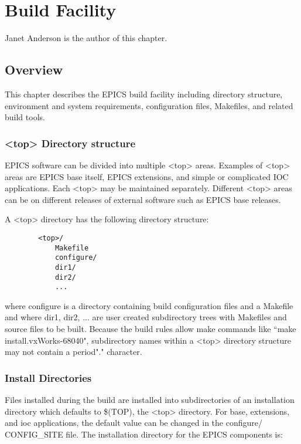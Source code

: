 \chapter{Build Facility}

Janet Anderson is the author of this chapter.

\section{Overview}

This chapter describes the EPICS build facility including directory structure, environment and system requirements, 
configuration files, Makefiles, and related build tools. 

\subsection{\textless{}top\textgreater{} Directory structure}

EPICS software can be divided into multiple \textless{}top\textgreater{} areas. Examples of \textless{}top\textgreater{} areas are EPICS base itself, EPICS 
extensions, and simple or complicated IOC applications. Each \textless{}top\textgreater{} may be maintained separately. Different \textless{}top\textgreater{} areas 
can be on different releases of external software such as EPICS base releases.

A \textless{}top\textgreater{} directory has the following directory structure:

\begin{verbatim}        <top>/
            Makefile
            configure/
            dir1/
            dir2/
            ...
\end{verbatim}where configure is a directory containing build configuration files and a Makefile and where dir1, dir2, ... are user created 
subdirectory trees with Makefiles and source files to be built. Because the build rules allow make commands like ``make 
install.vxWorks-68040", subdirectory names within a \textless{}top\textgreater{} directory structure may not contain a period"." character.

\subsection{Install Directories}

Files installed during the build are installed into subdirectories of an installation directory which defaults to \$(TOP), the 
\textless{}top\textgreater{} directory. For base, extensions, and ioc applications,  the default value can be changed in the configure/
CONFIG\_SITE file. The installation directory for the EPICS components is:

